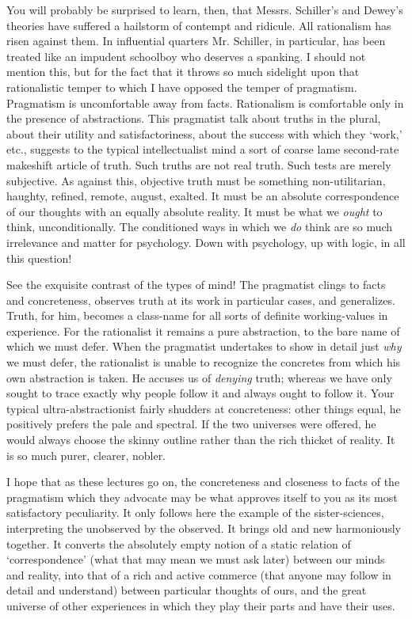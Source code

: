 \documentclass[]{article}
\begin{document}
You will probably be surprised to learn, then, that Messrs. Schiller's
and Dewey's theories have suffered a hailstorm of contempt and ridicule.
All rationalism has risen against them. In influential quarters Mr.
Schiller, in particular, has been treated like an impudent schoolboy who
deserves a spanking. I should not mention this, but for the fact that it
throws so much sidelight upon that rationalistic temper to which I have
opposed the temper of pragmatism. Pragmatism is uncomfortable away from
facts. Rationalism is comfortable only in the presence of abstractions.
This pragmatist talk about truths in the plural, about their utility
and satisfactoriness, about the success with which they `work,' etc.,
suggests to the typical intellectualist mind a sort of coarse lame
second-rate makeshift article of truth. Such truths are not real truth.
Such tests are merely subjective. As against this, objective truth must
be something non-utilitarian, haughty, refined, remote, august, exalted.
It must be an absolute correspondence of our thoughts with an equally
absolute reality. It must be what we \emph{ought} to think, unconditionally.
The conditioned ways in which we \emph{do} think are so much irrelevance and
matter for psychology. Down with psychology, up with logic, in all this
question!

See the exquisite contrast of the types of mind! The pragmatist clings
to facts and concreteness, observes truth at its work in particular
cases, and generalizes. Truth, for him, becomes a class-name for all
sorts of definite working-values in experience. For the rationalist it
remains a pure abstraction, to the bare name of which we must defer.
When the pragmatist undertakes to show in detail just \emph{why} we must defer,
the rationalist is unable to recognize the concretes from which his own
abstraction is taken. He accuses us of \emph{denying} truth; whereas we have
only sought to trace exactly why people follow it and always ought
to follow it. Your typical ultra-abstractionist fairly shudders at
concreteness: other things equal, he positively prefers the pale and
spectral. If the two universes were offered, he would always choose the
skinny outline rather than the rich thicket of reality. It is so much
purer, clearer, nobler.

I hope that as these lectures go on, the concreteness and closeness to
facts of the pragmatism which they advocate may be what approves itself
to you as its most satisfactory peculiarity. It only follows here the
example of the sister-sciences, interpreting the unobserved by the
observed. It brings old and new harmoniously together. It converts the
absolutely empty notion of a static relation of `correspondence' (what
that may mean we must ask later) between our minds and reality, into
that of a rich and active commerce (that anyone may follow in detail and
understand) between particular thoughts of ours, and the great universe
of other experiences in which they play their parts and have their uses.
\end{document}
